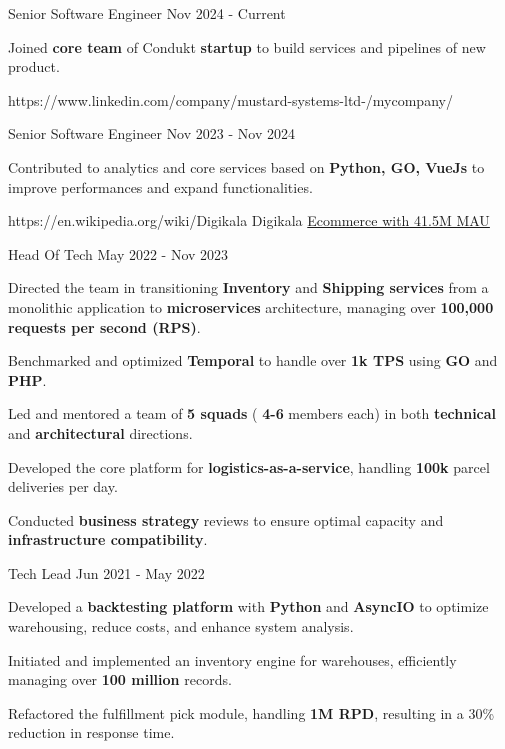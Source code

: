 \documentclass[
	10pt, %
]{FreemanCV}
\begin{document}
\begin{paracol}{2}
\position
{Senior Software Engineer}
{Nov 2024 - Current}
{
	
	\item Joined \textbf{core team} of Condukt \textbf{startup} to build services and pipelines of new product.
}


\company
{https://www.linkedin.com/company/mustard-systems-ltd-/mycompany/}
{}
{}


\position
{Senior Software Engineer}
{Nov 2023 - Nov 2024}
{

	\item Contributed to analytics and core services based on \textbf{Python, GO, VueJs} to improve performances and expand functionalities.
}
\vspace{5pt}
\company
{https://en.wikipedia.org/wiki/Digikala}
{Digikala}
{\href{https://about.digikala.com/en/reports/digikala1401/}{Ecommerce with 41.5M MAU}}

\position
{Head Of Tech}
{May 2022 - Nov 2023}
{
	
	\item Directed the team in transitioning \textbf{Inventory} and \textbf{Shipping services} from a monolithic application to \textbf{microservices} architecture, managing over \textbf{100,000 requests per second (RPS)}.
	\item Benchmarked and optimized \textbf{Temporal} to handle over \textbf{1k TPS} using \textbf{GO} and \textbf{PHP}.
	\item Led and mentored a team of \textbf{5 squads} (
	\textbf{4-6} members each) in both \textbf{technical} and \textbf{architectural} directions.
	\item Developed the core platform for \textbf{logistics-as-a-service}, handling \textbf{100k} parcel deliveries per day.
	\item Conducted \textbf{business strategy} reviews to ensure optimal capacity and \textbf{infrastructure compatibility}.

}

\position
{Tech Lead}
{Jun 2021 - May 2022}
{
\item Developed a \textbf{backtesting platform} with \textbf{Python} and \textbf{AsyncIO} to optimize warehousing, reduce costs, and enhance system analysis.
	\item Initiated and implemented an inventory engine for warehouses, efficiently managing over \textbf{100 million} records.
	\item Refactored the fulfillment pick module, handling \textbf{1M RPD}, resulting in a 30\% reduction in response time.
}


\end{paracol}
\end{document}

